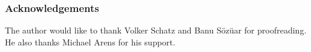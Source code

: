 \subsubsection{Acknowledgements}
The author would like to thank Volker Schatz and Banu Sözüar for proofreading. 
He also thanks Michael Arens for his support.
